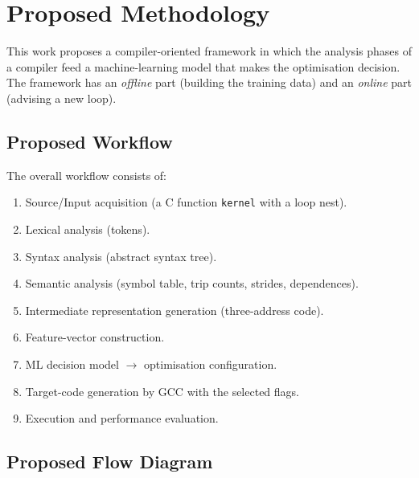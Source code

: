 \section{Proposed Methodology}
\label{sec:method}

This work proposes a compiler-oriented framework in which the analysis phases
of a compiler feed a machine-learning model that makes the optimisation
decision. The framework has an \emph{offline} part (building the training
data) and an \emph{online} part (advising a new loop).

\subsection{Proposed Workflow}

The overall workflow consists of:

\begin{enumerate}
    \item Source/Input acquisition (a C function \texttt{kernel} with a loop nest).
    \item Lexical analysis (tokens).
    \item Syntax analysis (abstract syntax tree).
    \item Semantic analysis (symbol table, trip counts, strides, dependences).
    \item Intermediate representation generation (three-address code).
    \item Feature-vector construction.
    \item ML decision model $\rightarrow$ optimisation configuration.
    \item Target-code generation by GCC with the selected flags.
    \item Execution and performance evaluation.
\end{enumerate}

\subsection{Proposed Flow Diagram}


